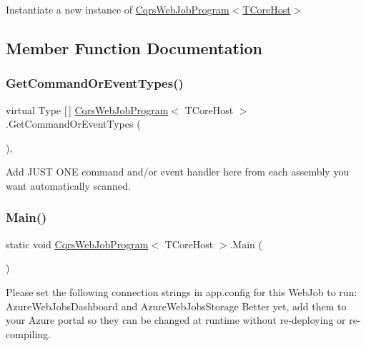 Instantiate a new instance of \hyperlink{classCqrsWebJobProgram_a7a7e74a9c2358374e3627abb36bd4462_a7a7e74a9c2358374e3627abb36bd4462}{Cqrs\+Web\+Job\+Program$<$\+T\+Core\+Host$>$} 



\subsection{Member Function Documentation}
\mbox{\label{classCqrsWebJobProgram_a07e42c1b43cb95a6d997a80a6a6c0a47_a07e42c1b43cb95a6d997a80a6a6c0a47}} 
\subsubsection{\texorpdfstring{Get\+Command\+Or\+Event\+Types()}{GetCommandOrEventTypes()}}
{\footnotesize\ttfamily virtual Type \mbox{[}$\,$\mbox{]} \hyperlink{classCqrsWebJobProgram}{Cqrs\+Web\+Job\+Program}$<$ T\+Core\+Host $>$.Get\+Command\+Or\+Event\+Types (\begin{DoxyParamCaption}{ }\end{DoxyParamCaption})\hspace{0.3cm}{\ttfamily [protected]}, {\ttfamily [virtual]}}



Add J\+U\+ST O\+NE command and/or event handler here from each assembly you want automatically scanned. 

\mbox{\label{classCqrsWebJobProgram_ae6a4d96517a362a031ec60c171501543_ae6a4d96517a362a031ec60c171501543}} 
\subsubsection{\texorpdfstring{Main()}{Main()}}
{\footnotesize\ttfamily static void \hyperlink{classCqrsWebJobProgram}{Cqrs\+Web\+Job\+Program}$<$ T\+Core\+Host $>$.Main (\begin{DoxyParamCaption}{ }\end{DoxyParamCaption})\hspace{0.3cm}{\ttfamily [static]}}

Please set the following connection strings in app.\+config for this Web\+Job to run\+: Azure\+Web\+Jobs\+Dashboard and Azure\+Web\+Jobs\+Storage Better yet, add them to your Azure portal so they can be changed at runtime without re-\/deploying or re-\/compiling. 
